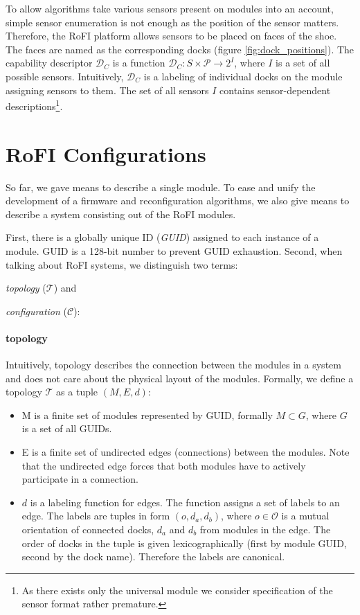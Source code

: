 To allow algorithms take various sensors present on modules into an account,
simple sensor enumeration is not enough as the position of the sensor matters.
Therefore, the RoFI platform allows sensors to be placed on faces of the shoe.
The faces are named as the corresponding docks (figure
\ref{fig:dock_positions}). The capability descriptor $\mathcal{D}_C$ is a
function $\mathcal{D}_C: S\times\mathcal{P} \rightarrow 2^{I}$, where $I$ is a
set of all possible sensors. Intuitively, $\mathcal{D}_C$ is a labeling of
individual docks on the module assigning sensors to them. The set of all sensors
$I$ contains sensor-dependent descriptions\footnote{As there exists only the
universal module we consider specification of the sensor format rather
premature.}.

\section{RoFI Configurations} \label{sec:configuration}

So far, we gave means to describe a single module. To ease and unify the
development of a firmware and reconfiguration algorithms, we also give means to
describe a system consisting out of the RoFI modules.

First, there is a globally unique ID (\emph{GUID}) assigned to each instance of
a module. GUID is a 128-bit number to prevent GUID exhaustion. Second, when
talking about RoFI systems, we distinguish two terms:
\begin{enumerate*}
    \item \emph{topology} ($\mathcal{T}$) and
    \item \emph{configuration} ($\mathcal{C}$):
\end{enumerate*}

\paragraph{topology} Intuitively, topology describes the connection between the
modules in a system and does not care about the physical layout of the modules.
Formally, we define a topology $\mathcal{T}$ as a tuple $(M, E, d)$:
\begin{itemize}
    \item M is a finite set of modules represented by GUID, formally $M\subset
    G$, where $G$ is a set of all GUIDs.
    \item E is a finite set of undirected edges (connections) between the
    modules. Note that the undirected edge forces that both modules have to
    actively participate in a connection.
    \item $d$ is a labeling function for edges. The function assigns a set of
    labels to an edge. The labels are tuples in form $(o, d_a, d_b)$, where
    $o\in\mathcal{O}$ is a mutual orientation of connected docks, $d_a$ and
    $d_b$ from modules in the edge. The order of docks in the tuple is given
    lexicographically (first by module GUID, second by the dock name). Therefore
    the labels are canonical.
\end{itemize}

